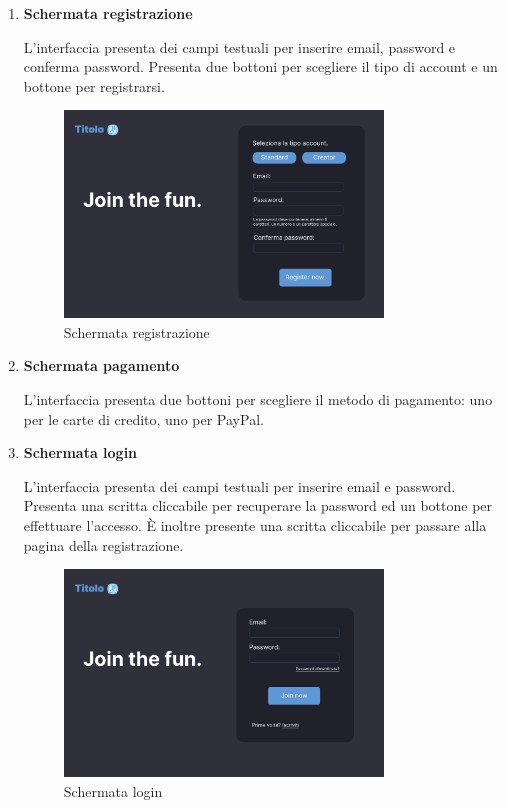 \documentclass[a4paper,12pt]{article}
\begin{document}
\begin{enumerate}[label=\textbf{FE\arabic*}\;, ref=\textbf{FE\arabic*}]
    \item \label{schermata registrazione} \textbf{Schermata registrazione}
    
    L'interfaccia presenta dei campi testuali per inserire email, password e conferma password. Presenta due bottoni per scegliere il tipo di account e un bottone per registrarsi.

    \begin{figure}[ht]
        \centering
        \includegraphics[width=0.8\textwidth]{schermata registrazione.png}
        \caption{Schermata registrazione}
        \label{fig:schermata_registrazione}
    \end{figure}

    \item \label{schermata pagamento} \textbf{Schermata pagamento}
    
    L'interfaccia presenta due bottoni per scegliere il metodo di pagamento: uno per le carte di credito, uno per PayPal.
    \item \label{schermata login} \textbf{Schermata login}
    
    L'interfaccia presenta dei campi testuali per inserire email e password. Presenta una scritta cliccabile per recuperare la password ed un bottone per effettuare l'accesso. È inoltre presente una scritta cliccabile per passare alla pagina della registrazione.

    \begin{figure}[ht]
        \centering
        \includegraphics[width=0.8\textwidth]{schermata login.png}
        \caption{Schermata login}
        \label{fig:schermata_login}
    \end{figure}


\end{enumerate}
\end{document}

